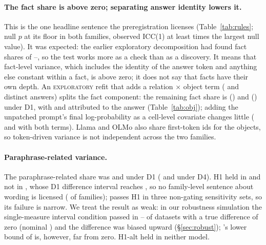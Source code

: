 \documentclass[11pt]{article}
\newcommand{\ICCone}{ICC(1)\xspace} %
\newcommand{\expl}{\textsc{exploratory}\xspace}
\newcommand{\olmo}{\OlmoTwoSevenB}
\newcommand{\llama}{\LlamaThreeOneEightB}
\begin{document}
\paragraph{The fact share is above zero; separating answer identity lowers it.}
This is the one headline sentence the preregistration licenses (Table~\ref{tab:rules}; null $p$ at its floor in both families, observed \ICCone{} at least \ptNullRatioMin{} times the largest null value).
It was expected: the earlier exploratory decomposition had found fact shares of \ptPriorIccLo--\ptPriorIccHi, so the test works more as a check than as a discovery.
It means that fact-level variance, which includes the identity of the answer token and anything else constant within a fact, is above zero; it does not say that facts have their own depth.
An \expl refit that adds a relation $\times$ object term (\explNObjectsLlama{} and \explNObjectsOlmo{} distinct answers) splits the fact component: the remaining fact share is \explObjFactDOneLlama{} (\llama) and \explObjFactDOneOlmo{} (\olmo) under D1, with \explObjObjDOneLlama{} and \explObjObjDOneOlmo{} attributed to the answer (Table~\ref{tab:obj}); adding the unpatched prompt's final log-probability as a cell-level covariate changes little (\explObjLpFactDOneLlama{} and \explObjLpFactDOneOlmo{} with both terms).
Llama and OLMo also share first-token ids for the objects, so token-driven variance is not independent across the two families.

\paragraph{Paraphrase-related variance.}
The paraphrase-related share was \ptWordingDOneLlama{} and \ptWordingDOneOlmo{} under D1 (\ptWordingDFourLlama{} and \ptWordingDFourOlmo{} under D4).
H1 held in \llama{} and not in \olmo, whose D1 difference interval reaches \ptDiffDOneLoOlmo, so no family-level sentence about wording is licensed (\ptNFamiliesHOne{} of \ptNFamiliesIncluded{} families); \olmo{} passes H1 in three non-gating sensitivity sets, so its failure is narrow.
We treat the \llama{} result as weak: in our robustness simulation the single-measure interval condition passed in \ptRobDiffLoPosMin--\ptRobDiffLoPosMax{} of datasets with a true difference of zero (nominal \ptNominalOneSided) and the difference was biased upward (\S\ref{sec:robust}); \llama's lower bound of \ptDiffDOneLoLlama{} is, however, far from zero.
H1-alt held in neither model.

\begin{table}[t]
\centering\small
\resizebox{\columnwidth}{!}{}
\caption{\expl What moves D1 (layers, correct cells). Top: root-mean-square change within a fact between two frames that differ in one feature (number of fact--frame pairs). Bottom: preregistered \expl H4 frame effects (fixed-effect refit), average shifts.}
\label{tab:pairs}
\end{table}
\end{document}
